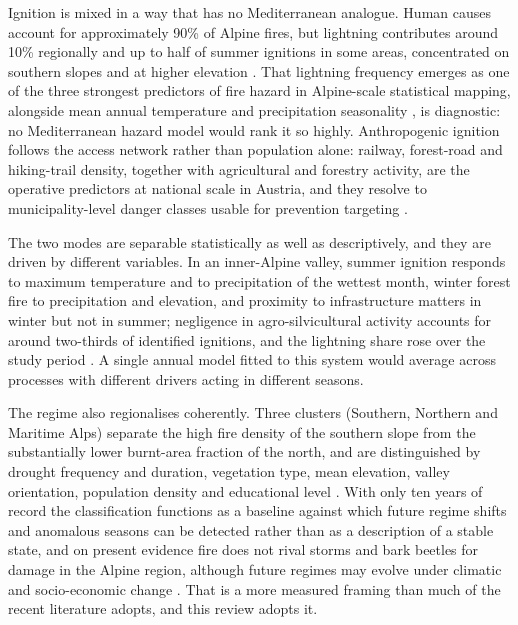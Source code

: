 \documentclass[11pt,a4paper]{article}
\begin{document}
Ignition is mixed in a way that has no Mediterranean analogue. Human causes account for approximately 90\% of Alpine fires, but lightning contributes around 10\% regionally and up to half of summer ignitions in some areas, concentrated on southern slopes and at higher elevation \citep{muller_forest_2020, valese_wildfires_2011}. That lightning frequency emerges as one of the three strongest predictors of fire hazard in Alpine-scale statistical mapping, alongside mean annual temperature and precipitation seasonality \citep{gerberding_mapping_2025}, is diagnostic: no Mediterranean hazard model would rank it so highly. Anthropogenic ignition follows the access network rather than population alone: railway, forest-road and hiking-trail density, together with agricultural and forestry activity, are the operative predictors at national scale in Austria, and they resolve to municipality-level danger classes usable for prevention targeting \citep{arndt_modeling_2013}.

The two modes are separable statistically as well as descriptively, and they are driven by different variables. In an inner-Alpine valley, summer ignition responds to maximum temperature and to precipitation of the wettest month, winter forest fire to precipitation and elevation, and proximity to infrastructure matters in winter but not in summer; negligence in agro-silvicultural activity accounts for around two-thirds of identified ignitions, and the lightning share rose over the study period \citep{vacchiano_modeling_2018}. A single annual model fitted to this system would average across processes with different drivers acting in different seasons.

The regime also regionalises coherently. Three clusters (Southern, Northern and Maritime Alps) separate the high fire density of the southern slope from the substantially lower burnt-area fraction of the north, and are distinguished by drought frequency and duration, vegetation type, mean elevation, valley orientation, population density and educational level \citep{conedera_characterizing_2018}. With only ten years of record the classification functions as a baseline against which future regime shifts and anomalous seasons can be detected rather than as a description of a stable state, and on present evidence fire does not rival storms and bark beetles for damage in the Alpine region, although future regimes may evolve under climatic and socio-economic change \citep{conedera_characterizing_2018}. That is a more measured framing than much of the recent literature adopts, and this review adopts it.
\end{document}
